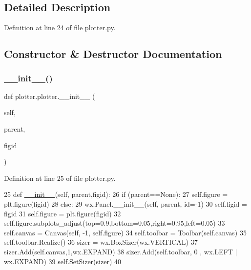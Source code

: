 \subsection{Detailed Description}


Definition at line 24 of file plotter.\+py.



\subsection{Constructor \& Destructor Documentation}
\mbox{\label{classplotter_1_1plotter_aa8c4aa595a3765f6f83ce75c1e9989ea}} 
\subsubsection{\texorpdfstring{\+\_\+\+\_\+init\+\_\+\+\_\+()}{\_\_init\_\_()}}
{\footnotesize\ttfamily def plotter.\+plotter.\+\_\+\+\_\+init\+\_\+\+\_\+ (\begin{DoxyParamCaption}\item[{}]{self,  }\item[{}]{parent,  }\item[{}]{figid }\end{DoxyParamCaption})}



Definition at line 25 of file plotter.\+py.


\begin{DoxyCode}
25         \textcolor{keyword}{def }\hyperlink{classwrapper_1_1ModuleDictWrapper_a9a7a794150502f51df687831583e13b9}{\_\_init\_\_}(self, parent,figid):
26                 \textcolor{keywordflow}{if} (parent==\textcolor{keywordtype}{None}):
27                         self.figure = plt.figure(figid)
28                 \textcolor{keywordflow}{else}:
29                         wx.Panel.\_\_init\_\_(self, parent, id=-1)
30                         self.figid  = figid
31                         self.figure = plt.figure(figid)
32                         self.figure.subplots\_adjust(top=0.9,bottom=0.05,right=0.95,left=0.05)
33                         self.canvas = Canvas(self, -1, self.figure)
34                         self.toolbar = Toolbar(self.canvas)
35                         self.toolbar.Realize()
36                         sizer = wx.BoxSizer(wx.VERTICAL)
37                         sizer.Add(self.canvas,1,wx.EXPAND)
38                         sizer.Add(self.toolbar, 0 , wx.LEFT | wx.EXPAND)
39                         self.SetSizer(sizer)
40                         
\end{DoxyCode}


